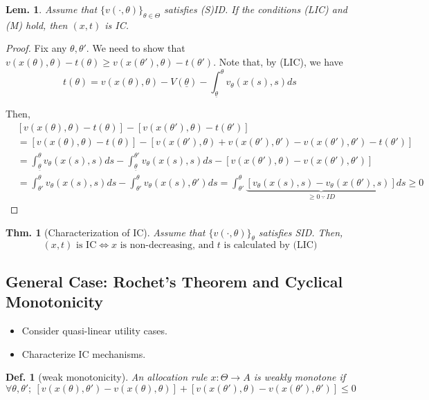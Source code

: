\documentclass[11pt,a4paper,dvipdfmx]{article}
\theoremstyle{plain}
\newtheorem{thm}{Thm.}[section]
\newtheorem{lem}{Lem.}[section]
\newtheorem{df}{Def.}[section]
\newcommand{\equi}{\Longleftrightarrow}
\newcommand{\1}{\mathbbm{1}}
\begin{document}
\begin{lem}
	Assume that $\{v(\cdot, \theta)\}_{\theta \in \Theta}$ satisfies (S)ID. If the conditions (LIC) and (M) hold, then $(x,t)$ is IC.
\end{lem}
\begin{proof}
	Fix any $\theta, \theta'$. We need to show that $v(x(\theta), \theta) - t(\theta) \geq v(x(\theta'), \theta) - t(\theta')$.
	Note that, by (LIC), we have 
	\[
	t(\theta) = v(x(\theta), \theta) - V(\underline{\theta}) - \int_{\underline{\theta}}^\theta
	 v_\theta(x(s), s) ds
	\]
	
	Then,
	\begin{align*}
		&[v(x(\theta), \theta) - t(\theta)] - [v(x(\theta'), \theta) - t(\theta')] \\
		&=
		[v(x(\theta), \theta) - t(\theta)] - [v(x(\theta'), \theta) + v(x(\theta'), \theta') - v(x(\theta'), \theta') - t(\theta')] \\
		&=
		\int_{\underline{\theta}}^\theta v_\theta(x(s), s) ds
		- \int_{\underline{\theta}}^{\theta'} v_\theta(x(s), s) ds
		- [v(x(\theta'), \theta) - v(x(\theta'), \theta')] \\
		&= \int_{\theta'}^\theta v_\theta(x(s), s) ds
		- \int_{\theta'}^\theta v_\theta(x(s), \theta') ds
		= 
		\int_{\theta'}^\theta \underbrace{
		[v_\theta(x(s), s) - v_\theta(x(\theta'), s)]
		}_{\geq 0 \ \because \ ID}
		ds \geq 0
	\end{align*}
\end{proof}

\begin{thm}[Characterization of IC] \label{ic_char}
	Assume that $\{v(\cdot, \theta)\}_\theta$ satisfies SID. Then, 
	\[
	\text{$(x, t)$ is IC} \equi \text{$x$ is non-decreasing, and $t$ is calculated by (LIC)}
	\]
\end{thm}


\subsection{General Case: Rochet's Theorem and Cyclical Monotonicity}
\begin{itemize}
	\item Consider quasi-linear utility cases.
	\item Characterize IC mechanisms.
\end{itemize}

\begin{df}[weak monotonicity]
	An allocation rule $x: \Theta \to A$ is weakly monotone if
	\[
	\forall \theta, \theta' ; \ [v(x(\theta), \theta') - v(x(\theta), \theta)]  + [v(x(\theta'), \theta) - v(x(\theta'), \theta')] \leq 0
	\]
\end{df}
\end{document}
